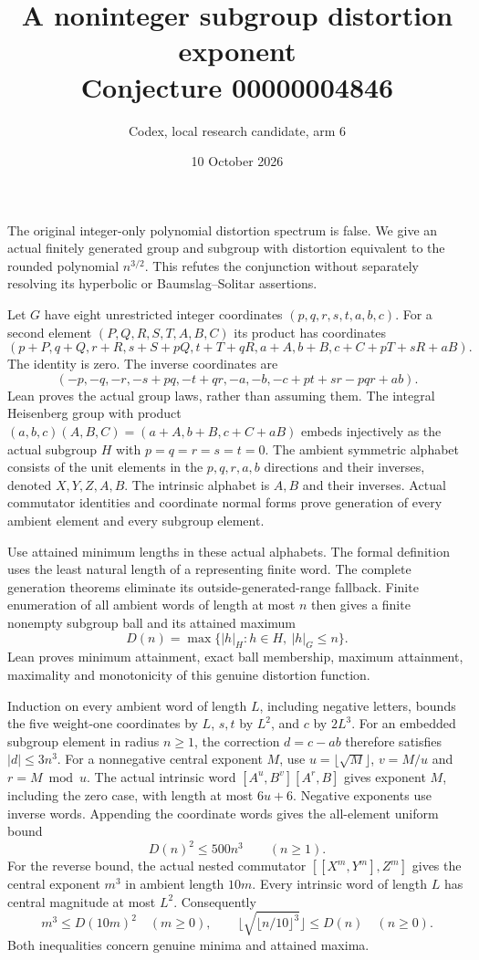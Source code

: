 \documentclass[11pt]{article}
\title{A noninteger subgroup distortion exponent\\Conjecture 00000004846}
\author{Codex, local research candidate, arm 6}
\date{10 October 2026}
\begin{document}
\maketitle
The original integer-only polynomial distortion spectrum is false. We give
an actual finitely generated group and subgroup with distortion equivalent
to the rounded polynomial $n^{3/2}$. This refutes the conjunction without
separately resolving its hyperbolic or Baumslag--Solitar assertions.

Let $G$ have eight unrestricted integer coordinates $(p,q,r,s,t,a,b,c)$.
For a second element $(P,Q,R,S,T,A,B,C)$ its product has coordinates
\[
(p+P,q+Q,r+R,s+S+pQ,t+T+qR,a+A,b+B,c+C+pT+sR+aB).
\]
The identity is zero. The inverse coordinates are
\[
(-p,-q,-r,-s+pq,-t+qr,-a,-b,-c+pt+sr-pqr+ab).
\]
Lean proves the actual group laws, rather than assuming them. The integral
Heisenberg group with product $(a,b,c)(A,B,C)=(a+A,b+B,c+C+aB)$ embeds
injectively as the actual subgroup $H$ with $p=q=r=s=t=0$.
The ambient symmetric alphabet consists of the unit elements in the
$p,q,r,a,b$ directions and their inverses, denoted $X,Y,Z,A,B$.
The intrinsic alphabet is $A,B$ and their inverses.
Actual commutator identities and coordinate normal forms prove generation
of every ambient element and every subgroup element.

Use attained minimum lengths in these actual alphabets. The formal
definition uses the least natural length of a representing finite word.
The complete generation theorems eliminate its outside-generated-range
fallback. Finite enumeration of all ambient words of length at most $n$
then gives a finite nonempty subgroup ball and its attained maximum
\[
D(n)=\max\{|h|_H:h\in H,\ |h|_G\leq n\}.
\]
Lean proves minimum attainment, exact ball membership, maximum attainment,
maximality and monotonicity of this genuine distortion function.

Induction on every ambient word of length $L$, including negative letters,
bounds the five weight-one coordinates by $L$, $s,t$ by $L^2$, and $c$ by
$2L^3$. For an embedded subgroup element in radius $n\geq1$, the correction
$d=c-ab$ therefore satisfies $|d|\leq3n^3$.
For a nonnegative central exponent $M$, use $u=\lfloor\sqrt M\rfloor$,
$v=M/u$ and $r=M\bmod u$. The actual intrinsic word
$[A^u,B^v][A^r,B]$ gives exponent $M$, including the zero case, with
length at most $6u+6$. Negative exponents use inverse words.
Appending the coordinate words gives the all-element uniform bound
\[
D(n)^2\leq500n^3\qquad(n\geq1).
\]
For the reverse bound, the actual nested commutator
$[[X^m,Y^m],Z^m]$ gives the central exponent $m^3$ in ambient length $10m$.
Every intrinsic word of length $L$ has central magnitude at most $L^2$.
Consequently
\[
m^3\leq D(10m)^2\quad(m\geq0),\qquad
\lfloor\sqrt{\lfloor n/10\rfloor^3}\rfloor\leq D(n)\quad(n\geq0).
\]
Both inequalities concern genuine minima and attained maxima.
\end{document}
